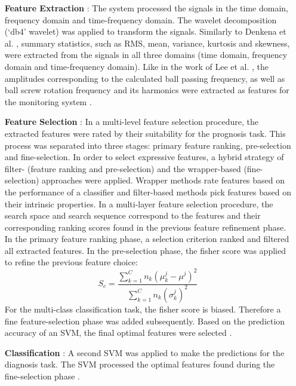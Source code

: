 \begin{itemize}
    \item [\textbf{Feature Extraction}]: The system processed the signals in the time domain, frequency domain and time-frequency domain. The wavelet decomposition (‘db4’ wavelet) was applied to transform the signals. Similarly to Denkena et al. \cite{Denkena2021}, summary statistics, such as RMS, mean, variance, kurtosis and skewness, were extracted from the signals in all three domains (time domain, frequency domain and time-frequency domain). Like in the work of Lee et al. \cite{Lee2015}, the amplitudes corresponding to the calculated ball passing frequency, as well as ball screw rotation frequency and its harmonics were extracted as features for the monitoring system \cite{LiPin2018}.
    \item [\textbf{Feature Selection}]: In a multi-level feature selection procedure, the extracted features were rated by their suitability for the prognosis task. This process was separated into three stages: primary feature ranking, pre-selection and fine-selection. In order to select expressive features, a hybrid strategy of filter- (feature ranking and pre-selection) and the wrapper-based (fine-selection) approaches were applied. Wrapper methods rate features based on the performance of a classifier and filter-based methods pick features based on their intrinsic properties. In a multi-layer feature selection procedure, the search space and search sequence correspond to the features and their corresponding ranking scores found in the previous feature refinement phase. In the primary feature ranking phase, a selection criterion ranked and filtered all extracted features. In the pre-selection phase, the fisher score was applied to refine the previous feature choice:
    \begin{equation}
        S_{c} = \frac{\sum_{k=1}^{C} n_{k}(\mu_{k}^{j}-\mu^{j})^{2}}{\sum_{k=1}^{C}n_{k}(\sigma_{k}^{j})^{2}}
    \end{equation}
    For the multi-class classification task, the fisher score is biased. Therefore a fine feature-selection phase was added subsequently. Based on the prediction accuracy of an SVM, the final optimal features were selected \cite{LiPin2018}.
    \item [\textbf{Classification}]: A second SVM was applied to make the predictions for the diagnosis task. The SVM processed the optimal features found during the fine-selection phase \cite{LiPin2018}. 
\end{itemize}


